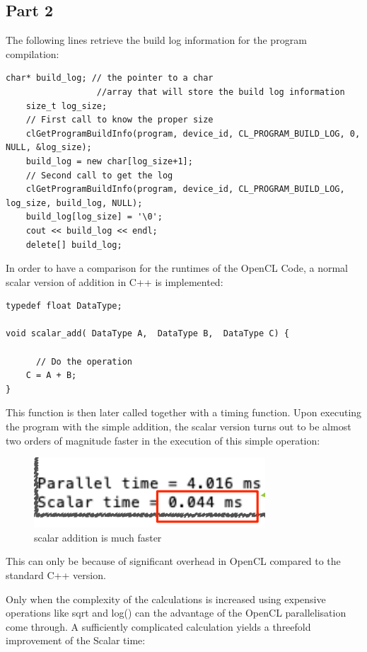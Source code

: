 \documentclass{article}
\begin{document}
\subsection*{Part 2}
The following lines retrieve the build log information for the program compilation:
\begin{lstlisting}[getting build log]
 char* build_log; // the pointer to a char  
                  //array that will store the build log information
    size_t log_size;
    // First call to know the proper size
    clGetProgramBuildInfo(program, device_id, CL_PROGRAM_BUILD_LOG, 0, NULL, &log_size);
    build_log = new char[log_size+1];
    // Second call to get the log
    clGetProgramBuildInfo(program, device_id, CL_PROGRAM_BUILD_LOG, log_size, build_log, NULL);
    build_log[log_size] = '\0';
    cout << build_log << endl;
    delete[] build_log;
\end{lstlisting}
In order to have a comparison for the runtimes  of the OpenCL Code, a normal scalar version of addition in C++ is implemented:

\begin{lstlisting}[scalar add in cpp]
typedef float DataType;

void scalar_add( DataType A,  DataType B,  DataType C) {

      // Do the operation
    C = A + B;
}
\end{lstlisting}
This function is then later called together with a timing function. 
Upon executing the program with the simple addition, the scalar version turns out to be almost two orders of magnitude faster in the execution of this simple operation:
\begin{figure}[H]
    \centering
    \includegraphics[scale=0.6]{scalar_add.png} 
    \caption{scalar addition is much faster}
    \label{fig:graph}
\end{figure}

This can only be because of significant overhead in OpenCL compared to the standard C++ version. 

Only when the complexity of the calculations is increased using expensive operations like sqrt and log() can the advantage of the OpenCL parallelisation come through. A sufficiently complicated calculation yields a threefold improvement of the Scalar time: 
\end{document}
